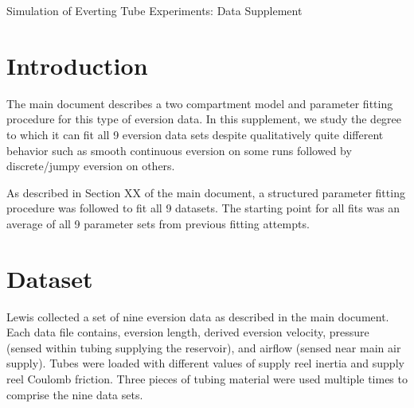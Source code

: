 \documentclass[letterpaper]{article}
\begin{document}
\begin{center}
{\Large Simulation of Everting Tube Experiments: Data Supplement}\\
\end{center}

\section{Introduction}
The main document describes a two compartment model and parameter fitting procedure
for this type of eversion data.   In this supplement, we study the degree to which it
can fit all 9 eversion data sets despite qualitatively quite different behavior such
as smooth continuous eversion on some runs followed by discrete/jumpy eversion on others.

As described in Section XX of the main document, a structured parameter fitting procedure
was followed to fit all 9 datasets.   The starting point for all fits was an average of
all 9 parameter sets from previous fitting attempts.

\section{Dataset}

Lewis \cite{xxxxxxxx}  collected a set of nine eversion data as described in the main document.
Each data file contains, eversion length, derived eversion velocity, pressure (sensed within
tubing supplying the reservoir), and airflow (sensed near main air supply).   Tubes were loaded
with different values of supply reel inertia and supply reel Coulomb friction.  Three pieces
of tubing material were used multiple times to comprise the nine data sets.
\end{document}
